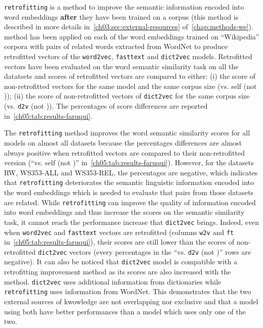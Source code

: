     \texttt{retrofitting} \citep{faruqui2015retrofitting} is a method to improve
    the semantic information encoded into word embeddings \textbf{after} they
    have been trained on a corpus (this method is described in more details
    in~\autoref{ch03:sec:external-resources} of~\autoref{chap:methods-we}).
    \citeauthor{faruqui2015retrofitting} method has been applied on each of the
    word embeddings trained on ``Wikipedia'' corpora with pairs of related words
    extracted from WordNet to produce retrofitted vectors of the
    \texttt{word2vec}, \texttt{fasttext} and \texttt{dict2vec} models.
    Retrofitted vectors have been evaluated on the word semantic similarity task
    on all the datatsets and scores of retrofitted vectors are compared to
    either: (i) the score of non-retrofitted vectors for the same model and the
    same corpus size (vs. self (not )); (ii) the score of
    non-retrofitted vectors of \texttt{dict2vec} for the same corpus size (vs.
    \texttt{d2v} (not )). The percentages of score differences are
    reported in~\autoref{ch05:tab:results-faruqui}.\smallskip

    The \texttt{retrofitting} method improves the word semantic similarity
    scores for all models on almost all datasets because the percentages
    differences are almost always positive when retrofitted vectors are compared
    to their non-retrofitted version (``vs. self (not )''
    in~\autoref{ch05:tab:results-faruqui}). However, for the datasets RW,
    WS353-ALL and WS353-REL, the percentages are negative, which indicates that
    \texttt{retrofitting} deteriorates the semantic linguistic information
    encoded into the word embeddings which is needed to evaluate that pairs from
    those datasets are related. While \texttt{retrofitting} can improve the
    quality of information encoded into word embeddings and thus increase the
    scores on the semantic similarity task, it cannot reach the performance
    increase that \texttt{dict2vec} brings. Indeed, even when \texttt{word2vec}
    and \texttt{fasttext} vectors are retrofitted (columns
    \texttt{w2v} and \texttt{ft}
    in~\autoref{ch05:tab:results-faruqui}), their scores are still lower than
    the scores of non-retrofitted \texttt{dict2vec} vectors (every percentages
    in the ``vs. \texttt{d2v} (not )'' rows are negative). It can also
    be noticed that \texttt{dict2vec} model is compatible with a retrofitting
    improvement method as its scores are also increased with
    the~\citeauthor{faruqui2015retrofitting} method. \texttt{dict2vec} uses
    additional information from dictionaries while \texttt{retrofitting} uses
    information from WordNet. This demonstrates that the two external sources of
    kwowledge are not overlapping nor exclusive and that a model using both have
    better performances than a model which uses only one of the two.

